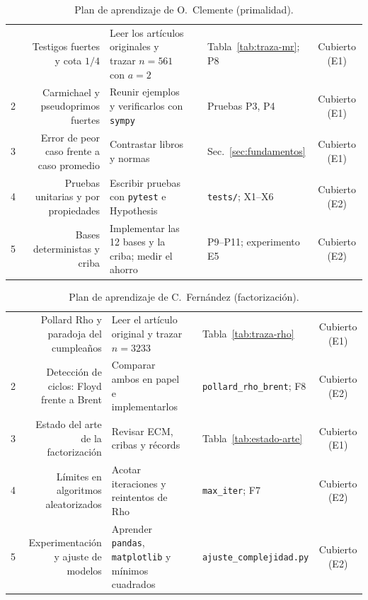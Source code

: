 \begin{table}[H]
\centering\footnotesize
\caption{Plan de aprendizaje de O.~Clemente (primalidad).}
\begin{tabularx}{\textwidth}{@{}c N Y F V S@{}}
 & Testigos fuertes y cota $1/4$ & Leer los artículos originales y trazar $n = 561$ con $a = 2$ & \cite{miller1976,rabin1980} & Tabla~\ref{tab:traza-mr}; P8 & Cubierto (E1)\\
2 & Carmichael y pseudoprimos fuertes & Reunir ejemplos y verificarlos con \texttt{sympy} & \cite{pomerance1980,sorenson2017} & Pruebas P3, P4 & Cubierto (E1)\\
3 & Error de peor caso frente a caso promedio & Contrastar libros y normas & \cite{dlp1993,fips186} & Sec.~\ref{sec:fundamentos} & Cubierto (E1)\\
4 & Pruebas unitarias y por propiedades & Escribir pruebas con \texttt{pytest} e Hypothesis & \cite{pytest,hypothesis} & \texttt{tests/}; X1--X6 & Cubierto (E2)\\
5 & Bases deterministas y criba & Implementar las 12 bases y la criba; medir el ahorro & \cite{sorenson2017} & P9--P11; experimento E5 & Cubierto (E2)\\
\bottomrule
\end{tabularx}
\end{table}

\begin{table}[H]
\centering\footnotesize
\caption{Plan de aprendizaje de C.~Fernández (factorización).}
\begin{tabularx}{\textwidth}{@{}c N Y F V S@{}}
 & Pollard Rho y paradoja del cumpleaños & Leer el artículo original y trazar $n = 3233$ & \cite{pollard1975,clrs} & Tabla~\ref{tab:traza-rho} & Cubierto (E1)\\
2 & Detección de ciclos: Floyd frente a Brent & Comparar ambos en papel e implementarlos & \cite{brent1980,knuth} & \texttt{pollard\_rho\_\allowbreak brent}; F8 & Cubierto (E2)\\
3 & Estado del arte de la factorización & Revisar ECM, cribas y récords & \cite{lenstra1987,boudot2020} & Tabla~\ref{tab:estado-arte} & Cubierto (E1)\\
4 & Límites en algoritmos aleatorizados & Acotar iteraciones y reintentos de Rho & \cite{pollard1975} & \texttt{max\_iter}; F7 & Cubierto (E2)\\
5 & Experimentación y ajuste de modelos & Aprender \texttt{pandas}, \texttt{matplotlib} y mínimos cuadrados & \cite{pydocs} & \texttt{ajuste\_\allowbreak complejidad.py} & Cubierto (E2)\\
\bottomrule
\end{tabularx}
\end{table}

